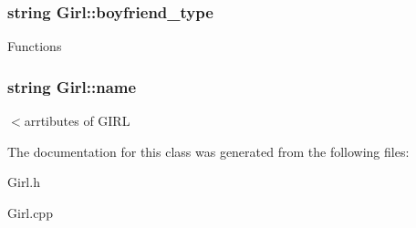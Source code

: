 \subsubsection[{\texorpdfstring{boyfriend\+\_\+type}{boyfriend_type}}]{\setlength{\rightskip}{0pt plus 5cm}string Girl\+::boyfriend\+\_\+type}\hypertarget{class_girl_a39f5234704c30029a76b251a1b41b41c}{}\label{class_girl_a39f5234704c30029a76b251a1b41b41c}
Functions 
\subsubsection[{\texorpdfstring{name}{name}}]{\setlength{\rightskip}{0pt plus 5cm}string Girl\+::name}\hypertarget{class_girl_ace47c55f2f3bc3237f6acba40302b442}{}\label{class_girl_ace47c55f2f3bc3237f6acba40302b442}
$<$arrtibutes of G\+I\+RL 

The documentation for this class was generated from the following files\+:\begin{DoxyCompactItemize}
\item 
Girl.\+h\item 
Girl.\+cpp\end{DoxyCompactItemize}

